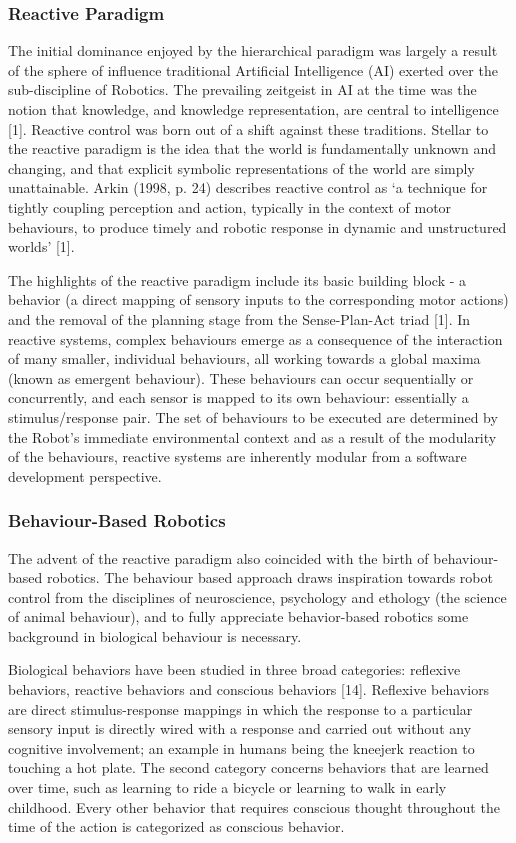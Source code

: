 \documentclass{article}
\begin{document}
	\subsubsection{Reactive Paradigm}
	The initial dominance enjoyed by the hierarchical paradigm was largely a result of the sphere of influence traditional Artificial Intelligence (AI) exerted over the sub-discipline of Robotics. The prevailing zeitgeist in AI at the time was the notion that knowledge, and knowledge representation, are central to intelligence [1]. Reactive control was born out of a shift against these traditions. Stellar to the reactive paradigm is the idea that the world is fundamentally unknown and changing, and that explicit symbolic representations of the world are simply unattainable. Arkin (1998, p. 24) describes reactive control as ‘a technique for tightly coupling perception and action, typically in the context of motor behaviours, to produce timely and robotic response in dynamic and unstructured worlds’ [1].

The highlights of the reactive paradigm include its basic building block - a behavior (a direct mapping of sensory inputs to the corresponding motor actions) and the removal of the planning stage from the Sense-Plan-Act triad [1]. In reactive systems, complex behaviours emerge as a consequence of the interaction of many smaller, individual behaviours, all working towards a global maxima (known as emergent behaviour). These behaviours can occur sequentially or concurrently, and each sensor is mapped to its own behaviour: essentially a stimulus/response pair. The set of behaviours to be executed are determined by the Robot’s immediate environmental context and as a result of the modularity of the behaviours, reactive systems are inherently modular from a software development perspective.

	\subsubsection{Behaviour-Based Robotics}
	The advent of the reactive paradigm also coincided with the birth of behaviour-based robotics. The behaviour based approach draws inspiration towards robot control from the disciplines of neuroscience, psychology and ethology (the science of animal behaviour), and to fully appreciate behavior-based robotics some background in biological behaviour is necessary.

Biological behaviors have been studied in three broad categories: reflexive behaviors, reactive behaviors and conscious behaviors [14]. Reflexive behaviors are direct stimulus-response mappings in which the response to a particular sensory input is directly wired with a response and carried out without any cognitive involvement; an example in humans being the kneejerk reaction to touching a hot plate. The second category concerns behaviors that are learned over time, such as learning to ride a bicycle or learning to walk in early childhood. Every other behavior that requires conscious thought throughout the time of the action is categorized as conscious behavior. 
\end{document}
